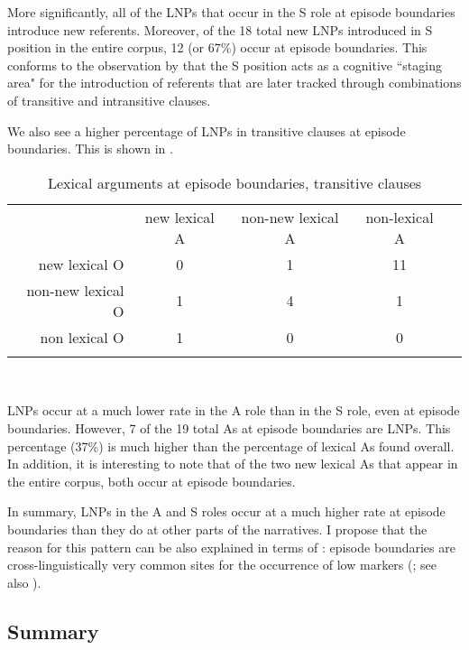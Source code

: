 More significantly, all of the LNPs that occur in the S role at episode boundaries introduce new referents. Moreover, of the 18 total new LNPs introduced in S position in the entire corpus, 12 (or 67{\%}) occur at episode boundaries. This conforms to the observation by \citet[831]{dubois1987} that the S position acts as a cognitive ``staging area" for the introduction of referents that are later tracked through combinations of transitive and intransitive clauses.

We also see a higher percentage of LNPs in transitive clauses at episode boundaries. This is shown in .

\begin{table}

\caption{{Lexical arguments at episode boundaries, transitive clauses}}
\begin{tabular}{ r  c  c  c  c }
\lsptoprule
 & new lexical A & non-new lexical A & non-lexical A \\

 
new lexical O & 0 & 1 & 11 \\

 
non-new lexical O & 1 & 4  & 1  \\

 
non lexical O & 1 &  0 & 0  \\

\lspbottomrule
\end{tabular}\\
\label{episodetr}

\end{table}

LNPs occur at a much lower rate in the A role than in the S role, even at episode boundaries. However, 7 of the 19 total As at episode boundaries are LNPs. This percentage (37{\%}) is much higher than the percentage of lexical As found overall. In addition, it is interesting to note that of the two new lexical As that appear in the entire corpus, both occur at episode boundaries. 

\newpage 
In summary, LNPs in the A and S roles occur at a much higher rate at episode boundaries than they do at other parts of the narratives. I propose that the reason for this pattern can be also explained in terms of : episode boundaries are cross-linguistically very common sites for the occurrence of low  markers (\citealt[52]{ariel2001}; see also \citealt{downing1980}).


\subsection{Summary}\label{discussion}

